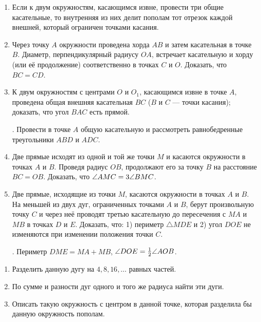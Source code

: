 {\begin{enumerate}
\item
Если к двум окружностям, касающимся извне, провести три общие касательные, то внутренняя из них делит пополам тот отрезок каждой внешней, который ограничен точками касания.

\item
Через точку $A$ окружности проведена хорда $AB$ и затем касательная в точке $B$.
Диаметр, перпендикулярный радиусу $OA$, встречает касательную и хорду (или её продолжение) соответственно в точках $C$ и $O$.
Доказать, что $BC=CD$.

\item
К двум окружностям с центрами $O$ и $O_1$, касающимся извне в точке $A$, проведена общая внешняя касательная $BC$ ($B$ и $C$ — точки касания);
доказать, что угол $BAC$ есть прямой.

\smallskip
{}.
Провести в точке $A$ общую касательную и рассмотреть равнобедренные треугольники $ABD$ и $ADC$.

\item
Две прямые исходят из одной и той же точки $M$ и касаются окружности в точках $A$ и $B$.
Проведя радиус $OB$, продолжают его за точку $B$ на расстояние $BC=OB$.
Доказать, что $\angle AMC\z=3\angle BMC$.

\item
Две прямые, исходящие из точки $M$, касаются окружности в точках $A$ и $B$.
На меньшей из двух дуг, ограниченных точками $A$ и $B$, берут произвольную точку $C$ и через неё проводят третью касательную до пересечения с $MA$ и $MB$ в точках $D$ и $E$.
Доказать, что:
1) периметр $\triangle MDE$ и 2) угол $DOE$ не изменяются при изменении положения точки $C$.

\smallskip
{}.
Периметр $DME=MA+MB$, $\angle DOE\z=\tfrac12 \angle AOB$.
\end{enumerate}


\begin{center}
\end{center}

\begin{enumerate}
\item
Разделить данную дугу на $4, 8, 16, \dots$
равных частей.

\item
По сумме и разности дуг одного и того же радиуса найти эти дуги.

\item
Описать такую окружность с центром в данной точке, которая разделила бы данную окружность пополам.


\end{enumerate}}
